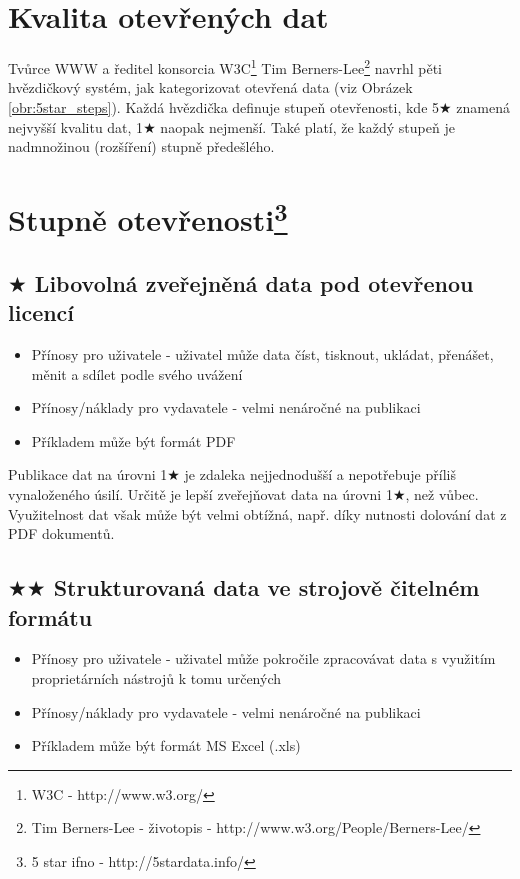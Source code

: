 \section{Kvalita otevřených dat}

Tvůrce WWW a ředitel konsorcia W3C\footnote{W3C - http://www.w3.org/} Tim Berners-Lee\footnote{Tim Berners-Lee - životopis - http://www.w3.org/People/Berners-Lee/} navrhl pěti hvězdičkový systém, jak kategorizovat otevřená data (viz Obrázek \ref{obr:5star_steps}). Každá hvězdička definuje stupeň otevřenosti, kde 5$\bigstar$ znamená nejvyšší kvalitu dat, 1$\bigstar$ naopak nejmenší. Také platí, že každý stupeň je nadmnožinou (rozšíření) stupně předešlého.

\section{Stupně otevřenosti\protect\footnote{5 star ifno - http://5stardata.info/}}

\subsection*{$\bigstar$ Libovolná zveřejněná data pod otevřenou licencí}

\medskip

\begin{itemize}
\item Přínosy pro uživatele - uživatel může data číst, tisknout, ukládat, přenášet, měnit a sdílet podle svého uvážení
\item Přínosy/náklady pro vydavatele - velmi nenáročné na publikaci
\item Příkladem může být formát PDF
\end{itemize}

Publikace dat na úrovni 1$\bigstar$ je zdaleka nejjednodušší a nepotřebuje příliš vynaloženého úsilí. Určitě je lepší zveřejňovat data na úrovni 1$\bigstar$, než vůbec. Využitelnost dat však může být velmi obtížná, např. díky nutnosti dolování dat z PDF dokumentů.

\subsection*{$\bigstar\bigstar$ Strukturovaná data ve strojově čitelném formátu}

\medskip

\begin{itemize}
\item Přínosy pro uživatele - uživatel může pokročile zpracovávat data s využitím proprietárních nástrojů k tomu určených
\item Přínosy/náklady pro vydavatele - velmi nenáročné na publikaci
\item Příkladem může být formát MS Excel (.xls)
\end{itemize}

